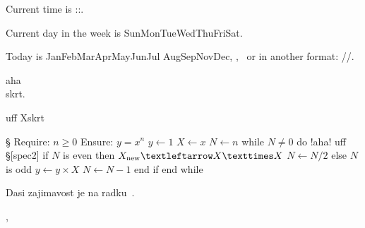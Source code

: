 \TEST \sethours \setseconds \setweekday \hours \minutes \seconds 

\sethours \setseconds
Current time is \the\hours:\Othe\minutes:\Othe\seconds.

\setweekday
Current day in the week is
\ifcase\weekday Sun\or Mon\or Tue\or Wed\or Thu\or Fri\or Sat\fi.

Today is
\ifcase\month\or Jan\or Feb\or Mar\or Apr\or May\or Jun\or Jul\or
   Aug\or Sep\or Nov\or Dec\fi, \the\day, \the\year
\ or in another format: \the\year/\Othe\month/\Othe\day.

\TEST \showpglists


\TEST \runsystem

\runsystem{}

\TEST \cancel

aha\cancel\\{skrt}.

uff \cancel X{skrt}

\TEST \algol

\begtt \ttlineref § \algol
Require: $n ≥ 0$
Ensure: $y = x^n$
   $y ← 1$
   $X ← x$
   $N ← n$
   while $N ≠ 0$ do !aha! uff §[spec2]
      if $N$ is even then
         $X_{\rm new} ← X × X$
         $N ← N/2$
      else {$N$ is odd}
         $y ← y × X$
         $N ← N − 1$
      end if
   end while
\endtt

Dasi zajimavost je na radku~\lref[spec2].

\TEST \correctvsize

\the\vsize, \correctvsize \the\vsize

\bye
